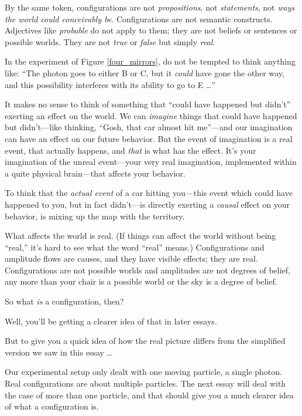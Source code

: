{
 By the same token, configurations are not \textit{propositions},
not \textit{statements}, not \textit{ways the world could conceivably
be}. Configurations are not semantic constructs. Adjectives like
\textit{probable} do not apply to them; they are not beliefs or
sentences or possible worlds. They are not \textit{true} or
\textit{false} but simply \textit{real}.}

{
 In the experiment of Figure \ref{four_mirrors}, do not be tempted to think
anything like: ``The photon goes to either B or C, but
it \textit{could} have gone the other way, and this possibility
interferes with its ability to go to E \ldots''}

{
 It makes no sense to think of something that
``could have happened but
didn't'' exerting an effect on the
world. We can \textit{imagine} things that could have happened but
didn't---like thinking, ``Gosh, that
car almost hit me''---and our imagination can have an
effect on our future behavior. But the event of imagination is a real
event, that actually happens, and \textit{that} is what has the effect.
It's your imagination of the unreal event---your very
real imagination, implemented within a quite physical brain---that
affects your behavior.}

{
 To think that the \textit{actual event} of a car hitting
you---this event which could have happened to you, but in fact
didn't---is directly exerting a \textit{causal} effect
on your behavior, is mixing up the map with the territory.}

{
 What affects the world is real. (If things can affect the world
without being ``real,''
it's hard to see what the word
``real'' means.) Configurations and
amplitude flows are causes, and they have visible effects; they are
real. Configurations are not possible worlds and amplitudes are not
degrees of belief, any more than your chair is a possible world or the
sky is a degree of belief.}

{
 So what \textit{is} a configuration, then?}

{
 Well, you'll be getting a clearer idea of that in
later essays.}

{
 But to give you a quick idea of how the real picture differs from
the simplified version we saw in this essay \ldots}

{
 Our experimental setup only dealt with one moving particle, a
single photon. Real configurations are about multiple particles. The
next essay will deal with the case of more than one particle, and that
should give you a much clearer idea of what a configuration is.}

